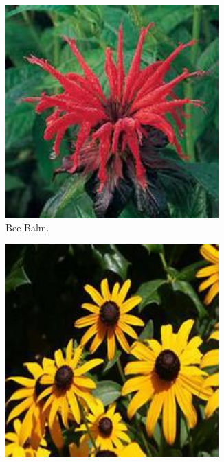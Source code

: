 \begin{figure}
    \centering
    \begin{subfigure}{0.24\textwidth}
        \centering
        \includegraphics[width=0.9\textwidth]{../example_images/BeeBalm.jpg}
        \caption{Bee Balm.}
    \end{subfigure}
    \begin{subfigure}{0.24\textwidth}
        \centering
        \includegraphics[width=0.9\textwidth]{../example_images/Black-eyedSusan.jpg}

\end{subfigure}
\end{figure}
